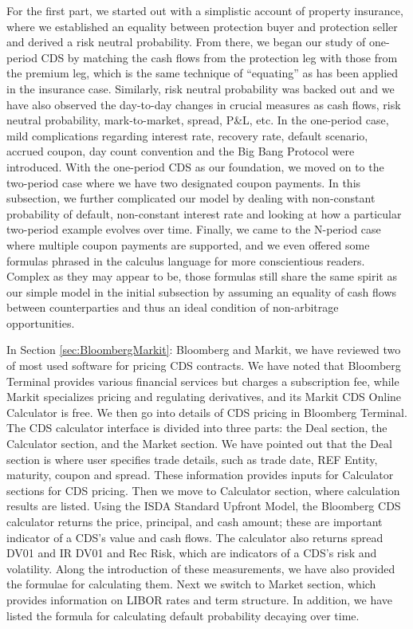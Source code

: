 \documentclass{jss}
\begin{document}

For the first part, we started out with a simplistic account of property insurance, where we established an equality between protection buyer and protection seller and derived a risk neutral probability. From there, we began our study of one-period CDS by matching the cash flows from the protection leg with those from the premium leg, which is the same technique of ``equating'' as has been applied in the insurance case. Similarly, risk neutral probability was backed out and we have also observed the day-to-day changes in crucial measures as cash flows, risk neutral probability, mark-to-market, spread, P\&L, etc. In the one-period case, mild complications regarding interest rate, recovery rate, default scenario, accrued coupon, day count convention and the Big Bang Protocol were introduced. With the one-period CDS as our foundation, we moved on to the two-period case where we have two designated coupon payments. In this subsection, we further complicated our model by dealing with non-constant probability of default, non-constant interest rate and looking at how a particular two-period example evolves over time. Finally, we came to the N-period case where multiple coupon payments are supported, and we even offered some formulas phrased in the calculus language for more conscientious readers. Complex as they may appear to be, those formulas still share the same spirit as our simple model in the initial subsection by assuming an equality of cash flows between counterparties and thus an ideal condition of non-arbitrage opportunities. 


In Section \ref{sec:BloombergMarkit}: Bloomberg and Markit, we have reviewed two of most used software for pricing CDS contracts. We have noted that Bloomberg Terminal provides various financial services but charges a subscription fee, while Markit specializes pricing and regulating derivatives, and its Markit CDS Online Calculator is free. We then go into details of CDS pricing in Bloomberg Terminal. The CDS calculator interface is divided into three parts: the Deal section, the Calculator section, and the Market section. We have pointed out that the Deal section is where user specifies trade details, such as trade date, REF Entity, maturity, coupon and spread. These information provides inputs for Calculator sections for CDS pricing. Then we move to Calculator section, where calculation results are listed. Using the ISDA Standard Upfront Model, the Bloomberg CDS calculator returns the price, principal, and cash amount; these are important indicator of a CDS's value and cash flows. The calculator also returns spread DV01 and IR DV01 and Rec Risk, which are indicators of a CDS's risk and volatility. Along the introduction of these measurements, we have also provided the formulae for calculating them. Next we switch to Market section, which provides information on LIBOR rates and term structure. In addition, we have listed the formula for calculating default probability decaying over time.
\end{document}
